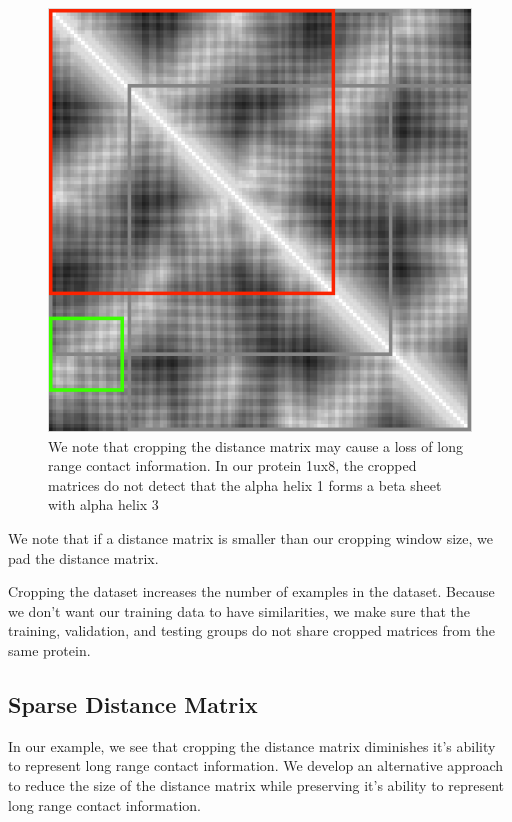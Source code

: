 \documentclass[12pt, a4paper, twocolumn, fullpage]{article}
\theoremstyle{plain}
\theoremstyle{definition}
\theoremstyle{remark}
\begin{document}
\begin{figure}[h]
    \centering
    \includegraphics[width=\linewidth]{cropMatMiss}
    \caption{We note that cropping the distance matrix may cause a loss of long range contact information. In our protein 1ux8, the cropped matrices do not detect that the alpha helix 1 forms a beta sheet with alpha helix 3}
    \label{cropMatMiss}
\end{figure}

We note that if a distance matrix is smaller than our cropping window size, we pad the distance matrix.

Cropping the dataset increases the number of examples in the dataset. Because we don't want our training data to have similarities, we make sure that the training, validation, and testing groups do not share cropped matrices from the same protein.

\subsection{ Sparse Distance Matrix}

In our example, we see that cropping the distance matrix diminishes it's ability to represent long range contact information. We develop an alternative approach to reduce the size of the distance matrix while preserving it's ability to represent long range contact information.
\end{document}
